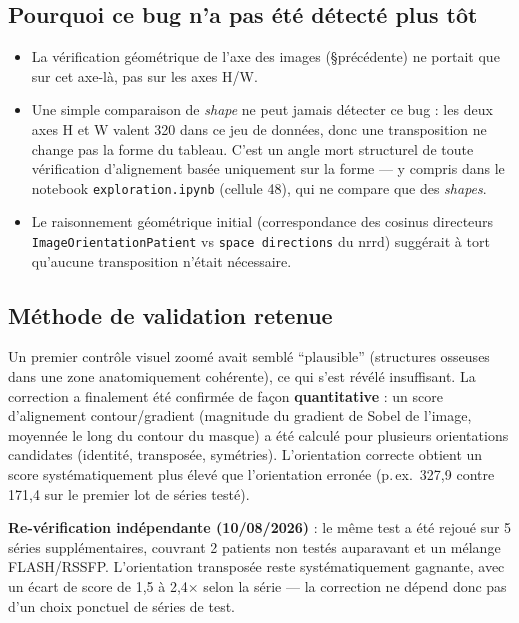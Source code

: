 \subsection{Pourquoi ce bug n'a pas été détecté plus tôt}

\begin{itemize}
    \item La vérification géométrique de l'axe des images (\S précédente) ne portait que sur cet
        axe-là, pas sur les axes H/W.
    \item Une simple comparaison de \emph{shape} ne peut jamais détecter ce bug : les deux axes H et W
        valent 320 dans ce jeu de données, donc une transposition ne change pas la forme du tableau.
        C'est un angle mort structurel de toute vérification d'alignement basée uniquement sur la
        forme --- y compris dans le notebook \texttt{exploration.ipynb} (cellule 48), qui ne compare
        que des \emph{shapes}.
    \item Le raisonnement géométrique initial (correspondance des cosinus directeurs
        \texttt{ImageOrientationPatient} vs \texttt{space directions} du nrrd) suggérait à tort
        qu'aucune transposition n'était nécessaire.
\end{itemize}

\subsection{Méthode de validation retenue}

Un premier contrôle visuel zoomé avait semblé ``plausible'' (structures osseuses dans une zone
anatomiquement cohérente), ce qui s'est révélé insuffisant. La correction a finalement été confirmée
de façon \textbf{quantitative} : un score d'alignement contour/gradient (magnitude du gradient de
Sobel de l'image, moyennée le long du contour du masque) a été calculé pour plusieurs orientations
candidates (identité, transposée, symétries). L'orientation correcte obtient un score systématiquement
plus élevé que l'orientation erronée (p.\,ex.\ 327,9 contre 171,4 sur le premier lot de séries testé).

\textbf{Re-vérification indépendante (10/08/2026)} : le même test a été rejoué sur 5 séries
supplémentaires, couvrant 2 patients non testés auparavant et un mélange FLASH/RSSFP. L'orientation
transposée reste systématiquement gagnante, avec un écart de score de 1,5 à 2,4$\times$ selon la série
--- la correction ne dépend donc pas d'un choix ponctuel de séries de test.

